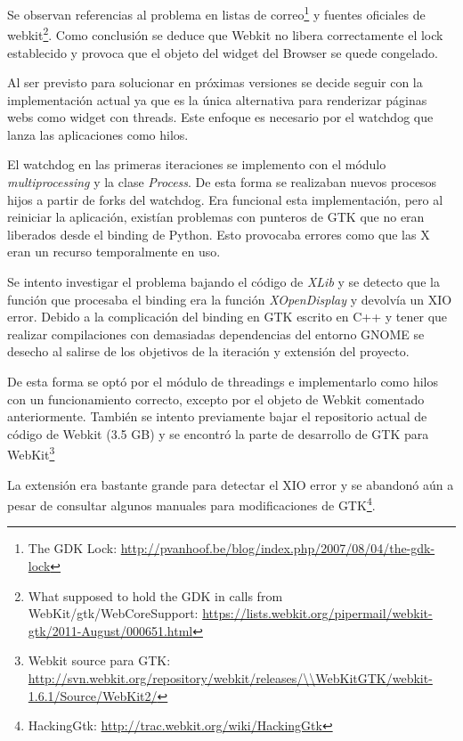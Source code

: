 Se observan referencias al problema en listas de correo\footnote{The GDK Lock:
\url{http://pvanhoof.be/blog/index.php/2007/08/04/the-gdk-lock}\label{ftn:GDKlock}}
y fuentes oficiales de webkit\footnote{What supposed to hold the GDK in calls from WebKit/gtk/WebCoreSupport:
\url{https://lists.webkit.org/pipermail/webkit-gtk/2011-August/000651.html}\label{ftn:WebkitLOCK}}.
Como conclusión se deduce que Webkit no libera correctamente el lock 
establecido y provoca que el objeto del widget del Browser se quede congelado.

Al ser previsto para solucionar en próximas versiones se decide seguir con la
implementación actual ya que es la única alternativa para renderizar páginas
webs como widget con threads. Este enfoque es necesario por el watchdog que
lanza las aplicaciones como hilos.

El watchdog en las primeras iteraciones se implemento con el módulo 
\emph{multiprocessing} y la clase \emph{Process}. De esta forma se realizaban
nuevos procesos hijos a partir de forks del watchdog. Era funcional esta
implementación, pero al reiniciar la aplicación, existían problemas con 
punteros de GTK que no eran liberados desde el
binding de Python. Esto provocaba errores como que las X eran un
recurso temporalmente en uso.

Se intento investigar el problema bajando el código de \emph{XLib} y se detecto
que la función que procesaba el binding era la función \emph{XOpenDisplay} y
devolvía un XIO error. Debido a la complicación del binding en GTK escrito en
C++ y tener que realizar compilaciones con demasiadas dependencias del 
entorno GNOME se desecho al salirse de los objetivos de la iteración y 
extensión del proyecto.

De esta forma se optó por el módulo de threadings e implementarlo como hilos
con un funcionamiento correcto, excepto por el objeto de Webkit comentado
anteriormente. También se intento previamente bajar el repositorio actual de
código de Webkit (3.5 GB) y se encontró la parte de desarrollo de GTK para 
WebKit\footnote{Webkit source para GTK:\\
\url{http://svn.webkit.org/repository/webkit/releases/\\WebKitGTK/webkit-1.6.1/Source/WebKit2/}\label{ftn:WebkitSourceGTK}} 

\newpage

La extensión era bastante grande para detectar el XIO error y se abandonó aún a
pesar de consultar algunos manuales para modificaciones de GTK\footnote{HackingGtk:
\url{http://trac.webkit.org/wiki/HackingGtk}\label{ftn:HackingGtk}}.

